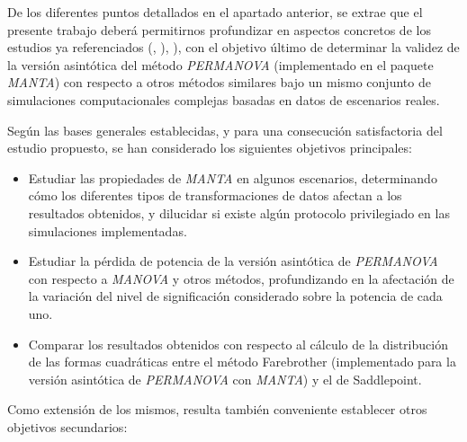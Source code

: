 \documentclass[IB,BIB]{TFUOC}%
\begin{document}
De los diferentes puntos detallados en el apartado anterior, se extrae que el presente trabajo deberá permitirnos profundizar en aspectos concretos de los estudios ya referenciados (\cite{garrido-martin_fast_2022}, \cite{garrido-martin_identification_2021}), \cite{monlong_identification_2014}), con el objetivo último de determinar la validez de la versión asintótica del método \textit{PERMANOVA} (implementado en el paquete \textit{MANTA}) con respecto a otros métodos similares bajo un mismo conjunto de simulaciones computacionales complejas basadas en datos de escenarios reales.

\newpage


Según las bases generales establecidas, y para una consecución satisfactoria del estudio propuesto, se han considerado los siguientes objetivos principales:

{\small
\begin{itemize}
    \item Estudiar las propiedades de \textit{MANTA} en algunos escenarios, determinando cómo los diferentes tipos de transformaciones de datos afectan a los resultados obtenidos, y dilucidar si existe algún protocolo privilegiado en las simulaciones implementadas.
    \item Estudiar la pérdida de potencia de la versión asintótica de \textit{PERMANOVA} con respecto a \textit{MANOVA} y otros métodos, profundizando en la afectación de la variación del nivel de significación considerado sobre la potencia de cada uno.
    \item Comparar los resultados obtenidos con respecto al cálculo de la distribución de las formas cuadráticas entre el método Farebrother (implementado para la versión asintótica de \textit{PERMANOVA} con \textit{MANTA}) y el de Saddlepoint.
\end{itemize}}

Como extensión de los mismos, resulta también conveniente establecer otros objetivos secundarios:
\end{document}
